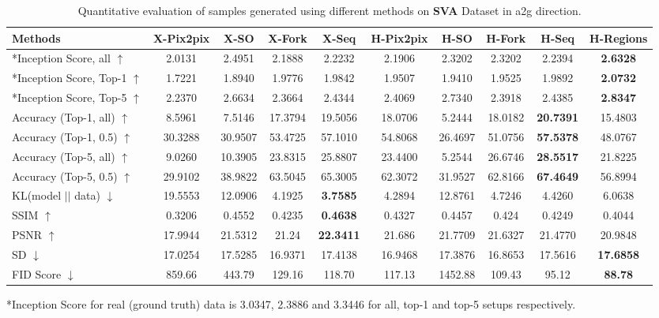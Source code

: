 \documentclass[times,twocolumn,final,authoryear]{elsarticle_modified}
\begin{document}
\begin{table*}[htbp]
 \small
   \renewcommand{\arraystretch}{.8}
  \centering
\caption{\small Quantitative evaluation of samples generated using different methods on {\bf SVA} Dataset in a2g direction.}
  \vspace{-10pt}
  \label{tab:sva_quant}
  
    \begin{tabular*}{\textwidth}{l @{\extracolsep{\fill}} cccc|cccc|c}
        \toprule  
 \textbf{Methods} & X-Pix2pix & X-SO & X-Fork & X-Seq & H-Pix2pix & H-SO & H-Fork & H-Seq & H-Regions \\
     \midrule
*Inception Score, all $\uparrow$ & {2.0131} & {2.4951} & {2.1888} & {2.2232}  & {2.1906} & 2.3202 & {2.3202}  & 2.2394 & \textbf{2.6328} \\
*Inception Score, Top-1 $\uparrow$ & {1.7221} & {1.8940} & {1.9776} & {1.9842}  & {1.9507} & 1.9410 & {1.9525}  & 1.9892  & \textbf{2.0732} \\
*Inception Score, Top-5 $\uparrow$ & {2.2370} & {2.6634} & {2.3664} & {2.4344}  & {2.4069} & 2.7340  & {2.3918}  & 2.4385 & \textbf{2.8347} \\

          \midrule
Accuracy (Top-1, all) $\uparrow$ & {8.5961} & {7.5146} & {17.3794} & {19.5056}  & {18.0706} & 5.2444 & {18.0182}  & \textbf{20.7391}  & 15.4803 \\ 
 Accuracy (Top-1, 0.5) $\uparrow$ & {30.3288} & {30.9507} & {53.4725} & {57.1010}  & {54.8068} & 26.4697 & {51.0756}  & \textbf{57.5378}  & 48.0767 \\ 
Accuracy (Top-5, all) $\uparrow$ & {9.0260} & {10.3905} & {23.8315} & {25.8807}  & {23.4400} & 5.2544  & {26.6746}  & \textbf{28.5517} & 21.8225 \\ 
 Accuracy (Top-5, 0.5) $\uparrow$ & {29.9102} & {38.9822} & {63.5045} & {65.3005}  & {62.3072} & 31.9527  & {62.8166}  & \textbf{67.4649} & 56.8994 \\ 
 
          \midrule
KL(model  $\mid$$\mid$ data) $\downarrow$ & {19.5553}  & {12.0906} & {4.1925} & \textbf{3.7585} & {4.2894} & 12.8761 & {4.7246}  & 4.4260  & 6.0638 \\ 

\midrule
SSIM $\uparrow$ & {0.3206} & {0.4552} & {0.4235} & \textbf{0.4638}  & {0.4327} & 0.4457 & {0.424}  & 0.4249 & 0.4044 \\
PSNR $\uparrow$ & {17.9944} & 21.5312 & {21.24} & \textbf{22.3411}  & 21.686 & 21.7709 & 21.6327  & 21.4770  & 20.9848 \\
SD $\downarrow$ & {17.0254} & 17.5285 & 16.9371 & {17.4138}  & 16.9468 & {17.3876} & 16.8653  & 17.5616 & \textbf{17.6858}\\
\midrule
FID Score $\downarrow$ & {859.66} & {443.79} & {129.16} & {118.70}  & {117.13} & {1452.88} &  {109.43} & 95.12 & \textbf{88.78}  \\

        \bottomrule
\end{tabular*}
{*Inception Score for real (ground truth) data is 3.0347, 2.3886 and 3.3446 for all, top-1 and top-5 setups respectively.}
\vspace{-10pt}
\end{table*}  
\end{document}
